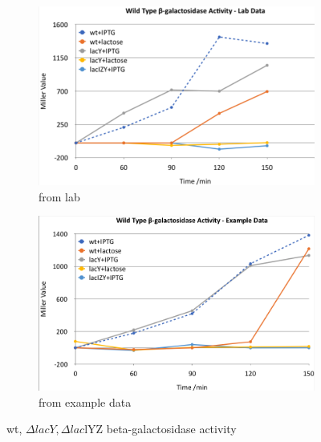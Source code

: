 \documentclass{article}
\begin{document}
\begin{figure}[htp]
\centering
\begin{subfigure}{.5\textwidth}
  \centering
  \includegraphics[width=1\linewidth]{all_lab.png}
	\caption{from lab}
	\label{fig:all_lab}
\end{subfigure}%
\begin{subfigure}{.5\textwidth}
  \centering
  \includegraphics[width=1\linewidth]{all_exp.png}
  \caption{from example data}
  \label{fig:all_exp}
\end{subfigure}
\caption{wt, $\Delta lacY, \Delta lac$lYZ beta-galactosidase activity}
\label{fig:all}
\end{figure}
\end{document}

